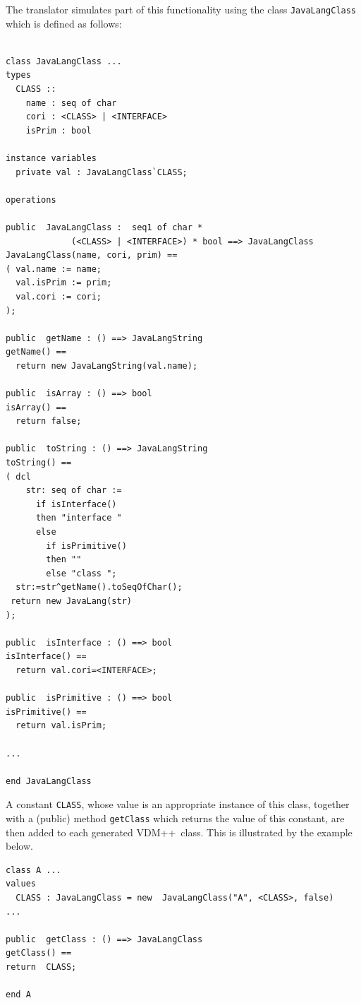 \documentclass[\pformat,12pt]{article}
\newcommand{\VDM}{VDM++}
\begin{document}
The translator simulates part of this functionality using the class
\texttt{JavaLangClass} which is defined as follows:

\begin{small}
\begin{verbatim}

class JavaLangClass ...
types
  CLASS ::
    name : seq of char
    cori : <CLASS> | <INTERFACE>
    isPrim : bool

instance variables
  private val : JavaLangClass`CLASS;

operations 

public  JavaLangClass :  seq1 of char * 
             (<CLASS> | <INTERFACE>) * bool ==> JavaLangClass
JavaLangClass(name, cori, prim) == 
( val.name := name;
  val.isPrim := prim;
  val.cori := cori;
);

public  getName : () ==> JavaLangString
getName() == 
  return new JavaLangString(val.name);

public  isArray : () ==> bool 
isArray() == 
  return false;

public  toString : () ==> JavaLangString
toString() == 
( dcl
    str: seq of char :=
      if isInterface()
      then "interface "
      else 
        if isPrimitive()
        then ""
        else "class ";
  str:=str^getName().toSeqOfChar();
 return new JavaLang(str)
);

public  isInterface : () ==> bool 
isInterface() == 
  return val.cori=<INTERFACE>;

public  isPrimitive : () ==> bool 
isPrimitive() == 
  return val.isPrim;

...

end JavaLangClass

\end{verbatim}
\end{small}

A constant \texttt{CLASS}, whose value is an appropriate instance of
this class, together with a (public) method \texttt{getClass} which
returns the value of this constant, are then added to each generated
\VDM\ class. This is illustrated by the example below. 

\begin{small}
\begin{verbatim}
class A ...
values 
  CLASS : JavaLangClass = new  JavaLangClass("A", <CLASS>, false)
...

public  getClass : () ==> JavaLangClass
getClass() == 
return  CLASS;

end A
\end{verbatim}
\end{small}
\end{document}
